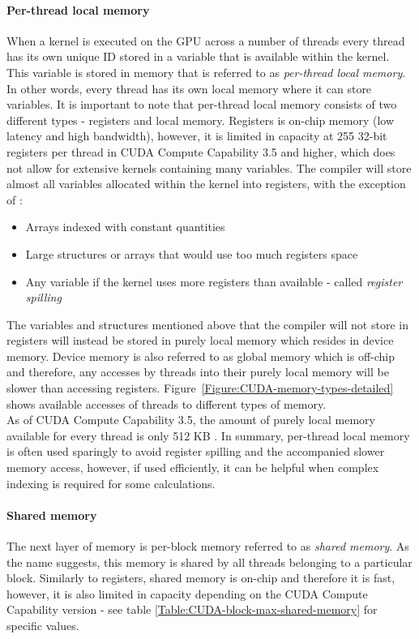 \paragraph{Per-thread local memory}
When a kernel is executed on the GPU across a number of threads every thread has its own unique ID stored in a variable that is available within the kernel. This variable is stored in memory that is referred to as \textit{per-thread local memory}. In other words, every thread has its own local memory where it can store variables. It is important to note that per-thread local memory consists of two different types - registers and local memory. Registers is on-chip memory (low latency and high bandwidth), however, it is limited in capacity at 255 32-bit registers per thread in CUDA Compute Capability 3.5 and higher, which does not allow for extensive kernels containing many variables. The compiler will store almost all variables allocated within the kernel into registers, with the exception of \cite{NVIDIAMay2022}:
\begin{itemize}
	\item Arrays indexed with constant quantities
	\item Large structures or arrays that would use too much registers space
	\item Any variable if the kernel uses more registers than available - called \textit{register spilling}
\end{itemize}
The variables and structures mentioned above that the compiler will not store in registers will instead be stored in purely local memory which resides in device memory. Device memory is also referred to as global memory which is off-chip and therefore, any accesses by threads into their purely local memory will be slower than accessing registers. Figure~\ref{Figure:CUDA-memory-types-detailed} shows available accesses of threads to different types of memory. \\
As of CUDA Compute Capability 3.5, the amount of purely local memory available for every thread is only 512 KB \cite{NVIDIAMay2022}. In summary, per-thread local memory is often used sparingly to avoid register spilling and the accompanied slower memory access, however, if used efficiently, it can be helpful when complex indexing is required for some calculations.

\paragraph{Shared memory}\label{Paragraph:CUDA-memory-management-shared-memory}
The next layer of memory is per-block memory referred to as \textit{shared memory}. As the name suggests, this memory is shared by all threads belonging to a particular block. Similarly to registers, shared memory is on-chip and therefore it is fast, however, it is also limited in capacity depending on the CUDA Compute Capability version - see table \ref{Table:CUDA-block-max-shared-memory} for specific values.

